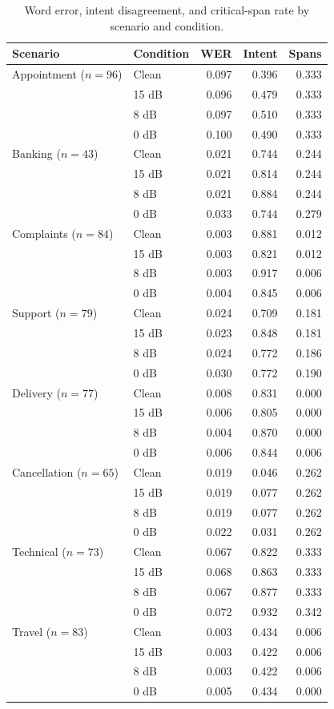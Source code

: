 \begin{table}[htbp]
\centering
\caption{Word error, intent disagreement, and critical-span rate by scenario and condition.}
\label{tab:scenario}
\small
\begin{tabular}{llrrr}
\toprule
Scenario & Condition & WER & Intent & Spans \\
\midrule
Appointment ($n{=}96$) & Clean & 0.097 & 0.396 & 0.333 \\
 & 15 dB & 0.096 & 0.479 & 0.333 \\
 & 8 dB & 0.097 & 0.510 & 0.333 \\
 & 0 dB & 0.100 & 0.490 & 0.333 \\
Banking ($n{=}43$) & Clean & 0.021 & 0.744 & 0.244 \\
 & 15 dB & 0.021 & 0.814 & 0.244 \\
 & 8 dB & 0.021 & 0.884 & 0.244 \\
 & 0 dB & 0.033 & 0.744 & 0.279 \\
Complaints ($n{=}84$) & Clean & 0.003 & 0.881 & 0.012 \\
 & 15 dB & 0.003 & 0.821 & 0.012 \\
 & 8 dB & 0.003 & 0.917 & 0.006 \\
 & 0 dB & 0.004 & 0.845 & 0.006 \\
Support ($n{=}79$) & Clean & 0.024 & 0.709 & 0.181 \\
 & 15 dB & 0.023 & 0.848 & 0.181 \\
 & 8 dB & 0.024 & 0.772 & 0.186 \\
 & 0 dB & 0.030 & 0.772 & 0.190 \\
Delivery ($n{=}77$) & Clean & 0.008 & 0.831 & 0.000 \\
 & 15 dB & 0.006 & 0.805 & 0.000 \\
 & 8 dB & 0.004 & 0.870 & 0.000 \\
 & 0 dB & 0.006 & 0.844 & 0.006 \\
Cancellation ($n{=}65$) & Clean & 0.019 & 0.046 & 0.262 \\
 & 15 dB & 0.019 & 0.077 & 0.262 \\
 & 8 dB & 0.019 & 0.077 & 0.262 \\
 & 0 dB & 0.022 & 0.031 & 0.262 \\
Technical ($n{=}73$) & Clean & 0.067 & 0.822 & 0.333 \\
 & 15 dB & 0.068 & 0.863 & 0.333 \\
 & 8 dB & 0.067 & 0.877 & 0.333 \\
 & 0 dB & 0.072 & 0.932 & 0.342 \\
Travel ($n{=}83$) & Clean & 0.003 & 0.434 & 0.006 \\
 & 15 dB & 0.003 & 0.422 & 0.006 \\
 & 8 dB & 0.003 & 0.422 & 0.006 \\
 & 0 dB & 0.005 & 0.434 & 0.000 \\
\bottomrule
\end{tabular}
\end{table}
